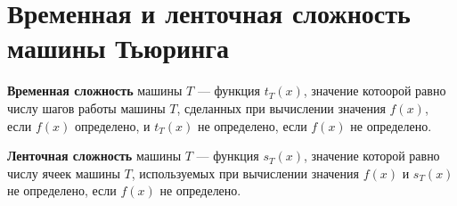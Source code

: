 \section{Временная и ленточная сложность машины Тьюринга}
\dftion \textbf{Временная сложность} машины $T$ --- функция $t_T(x)$, значение котоорой равно числу шагов работы машины $T$, сделанных при вычислении значения $f(x)$, если $f(x)$ определено, и $t_T(x)$ не определено, если $f(x)$ не определено.

\dftion \textbf{Ленточная сложность} машины $T$ --- функция $s_T(x)$, значение которой равно числу ячеек машины $T$, используемых при вычислении значения $f(x)$ и $s_T(x)$ не определено, если $f(x)$ не определено.